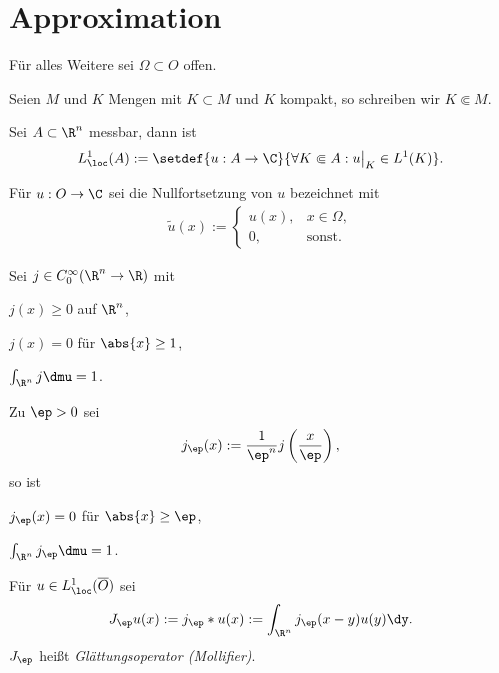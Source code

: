 \section{Approximation}

Für alles Weitere sei $\Omega\subset O$ offen.

\begin{defn}
\label{defn:7.42}
\begin{defnenum}
\item Seien $M$ und $K$ Mengen mit $K\subset M$ und $K$ kompakt, so schreiben
wir $K\Subset M$.
\item Sei $A\subset\R^n$ messbar, dann ist
\begin{align*}
L^1_\loc(A) := \setdef{u: A\to\C}{\forall K\Subset A : u\big|_K \in L^1(K)}.
\end{align*}
\item Für $u: O\to\C$ sei die Nullfortsetzung von
$u$ bezeichnet mit
\begin{align*}
\tilde{u}(x) := \begin{cases}
                u(x), & x\in \Omega,\\
                0, & \text{sonst}.
                \end{cases}
\end{align*}  
\item Sei $j\in C_0^\infty(\R^n\to\R)$ mit
\begin{equivenum}
\item $j(x)\ge 0$ auf $\R^n$,
\item $j(x) = 0$ für $\abs{x}\ge 1$,
\item $\int_{\R^n} j\dmu = 1$.
\end{equivenum}
Zu $\ep > 0$ sei
\begin{align*}
j_\ep(x) := \frac{1}{\ep^n}j\left(\frac{x}{\ep}\right),
\end{align*}
so ist
\begin{equivenum}
\item $j_\ep(x) = 0$ für $\abs{x}\ge \ep$,
\item $\int_{\R^n} j_\ep \dmu = 1$.
\end{equivenum}
Für $u\in L^1_\loc(\overline{O})$ sei
\begin{align*}
J_\ep u(x) := j_\ep * u(x) := \int_{\R^n} j_\ep(x-y)u(y)\dy. 
\end{align*}
$J_\ep$ heißt \emph{Glättungsoperator
(Mollifier)}.\fishhere
\end{defnenum}
\end{defn}


